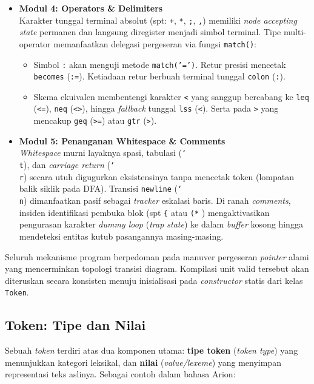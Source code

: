 \documentclass[12pt,a4paper]{article}
\begin{document}
\begin{itemize}
    \item \textbf{Modul 4: Operators \& Delimiters}\\
    Karakter tunggal terminal absolut (spt: \texttt{+}, \texttt{*}, \texttt{;}, \texttt{,}) memiliki \textit{node accepting state} permanen dan langsung diregister menjadi simbol terminal. Tipe multi-operator memanfaatkan delegasi pergeseran via fungsi \texttt{match()}:
    \begin{itemize}
        \item Simbol \texttt{:} akan menguji metode \texttt{match('=')}. Retur presisi mencetak \texttt{becomes} (\texttt{:=}). Ketiadaan retur berbuah terminal tunggal \texttt{colon} (\texttt{:}).
        \item Skema ekuivalen membentengi karakter \texttt{<} yang sanggup bercabang ke \texttt{leq} (\texttt{<=}), \texttt{neq} (\texttt{<>}), hingga \textit{fallback} tunggal \texttt{lss} (\texttt{<}). Serta pada \texttt{>} yang mencakup \texttt{geq} (\texttt{>=}) atau \texttt{gtr} (\texttt{>}).
    \end{itemize}

    \item \textbf{Modul 5: Penanganan Whitespace \& Comments}\\
    \textit{Whitespace} murni layaknya spasi, tabulasi (\texttt{\char`\\t}), dan \textit{carriage return} (\texttt{\char`\\r}) secara utuh digugurkan eksistensinya tanpa mencetak token (lompatan balik siklik pada DFA). Transisi \texttt{newline} (\texttt{\char`\\n}) dimanfaatkan pasif sebagai \textit{tracker} eskalasi baris.
    Di ranah \textit{comments}, insiden identifikasi pembuka blok (spt \texttt{\{} atau \texttt{(*} ) mengaktivasikan pengurasan karakter \textit{dummy loop} (\textit{trap state}) ke dalam \textit{buffer} kosong hingga mendeteksi entitas kutub pasangannya masing-masing.
\end{itemize}

Seluruh mekanisme program berpedoman pada manuver pergeseran \textit{pointer} alami yang mencerminkan topologi transisi diagram. Kompilasi unit valid tersebut akan diteruskan secara konsisten menuju inisialisasi pada \textit{constructor} statis dari kelas \texttt{Token}.

\subsection{Token: Tipe dan Nilai}
Sebuah \textit{token} terdiri atas dua komponen utama: \textbf{tipe token} (\textit{token type}) yang menunjukkan kategori leksikal, dan \textbf{nilai} (\textit{value/lexeme}) yang menyimpan representasi teks aslinya. Sebagai contoh dalam bahasa Arion:
\end{document}
